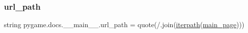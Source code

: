\mbox{\label{namespacepygame_1_1docs_1_1____main_____a8a7fb440bd71a5e2d4a7d4f7fc978f9d}} 
\subsubsection{\texorpdfstring{url\+\_\+path}{url\_path}}
{\footnotesize\ttfamily string pygame.\+docs.\+\_\+\+\_\+main\+\_\+\+\_\+.\+url\+\_\+path = quote(\textquotesingle{}/\textquotesingle{}.join(\hyperlink{namespacepygame_1_1docs_1_1____main_____aa3927023e6bbbb361b7a23b4d8a1dca2}{iterpath}(\hyperlink{namespacepygame_1_1docs_1_1____main_____af85791b50146174a3241d29b2f397458}{main\+\_\+page})))}

